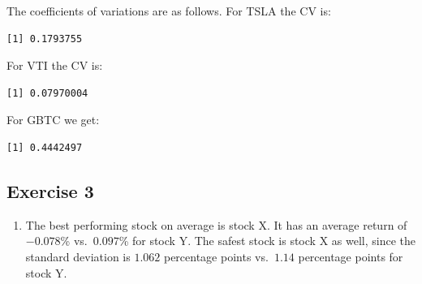 \documentclass[
  letterpaper,
  DIV=11,
  numbers=noendperiod]{scrreprt}
\newenvironment{Shaded}{\begin{snugshade}}{\end{snugshade}}
\newcommand{\FunctionTok}[1]{\textcolor[rgb]{0.28,0.35,0.67}{#1}}
\newcommand{\NormalTok}[1]{\textcolor[rgb]{0.00,0.23,0.31}{#1}}
\newcommand{\OtherTok}[1]{\textcolor[rgb]{0.00,0.23,0.31}{#1}}
\newcommand{\SpecialCharTok}[1]{\textcolor[rgb]{0.37,0.37,0.37}{#1}}
\providecommand{\tightlist}{%
  \setlength{\itemsep}{0pt}\setlength{\parskip}{0pt}}\usepackage{longtable,booktabs,array}
\begin{document}
The coefficients of variations are as follows. For TSLA the CV is:

\begin{Shaded}
\end{Shaded}

\begin{verbatim}
[1] 0.1793755
\end{verbatim}

For VTI the CV is:

\begin{Shaded}
\end{Shaded}

\begin{verbatim}
[1] 0.07970004
\end{verbatim}

For GBTC we get:

\begin{Shaded}
\end{Shaded}

\begin{verbatim}
[1] 0.4442497
\end{verbatim}

\hypertarget{exercise-3-7}{%
\subsection*{Exercise 3}\label{exercise-3-7}}

\begin{blackbox}

\begin{enumerate}
\def\labelenumi{\arabic{enumi}.}
\tightlist
\item
  The best performing stock on average is stock X. It has an average
  return of \(-0.078\)\% vs.~\(0.097\)\% for stock Y. The safest stock
  is stock X as well, since the standard deviation is \(1.062\)
  percentage points vs.~\(1.14\) percentage points for stock Y.
\end{enumerate}

\end{blackbox}
\end{document}
